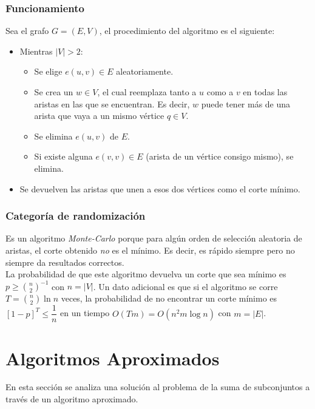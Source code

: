 \documentclass[a4paper, 10pt]{article}
\newcommand\tab[1][0.5cm]{\hspace*{#1}}
\begin{document}
            \subsubsection{Funcionamiento}
                Sea el grafo $G = (E, V)$, el procedimiento del algoritmo es el siguiente:
                \begin{itemize}
                    \item Mientras $|V| > 2$:
                    \begin{itemize}
                        \item Se elige $e(u, v) \in E$ aleatoriamente.
                        \item Se crea un $w \in V$, el cual reemplaza tanto a $u$ como a $v$ en todas
                        las aristas en las que se encuentran. Es decir, $w$ puede tener más de una arista
                        que vaya a un mismo vértice $q \in V$.
                        \item Se elimina $e(u, v)$ de $E$.
                        \item Si existe alguna $e(v, v) \in E$ (arista de un vértice consigo mismo), se elimina.
                    \end{itemize}
                    \item Se devuelven las aristas que unen a esos dos vértices como el corte mínimo.
                \end{itemize}
            \subsubsection{Categoría de randomización}
                    Es un algoritmo \emph{Monte-Carlo} porque para algún orden de selección aleatoria
                de aristas, el corte obtenido \emph{no} es el mínimo. Es decir, es rápido siempre pero no siempre
                da resultados correctos. \\
                \tab La probabilidad de que este algoritmo devuelva un corte que sea mínimo es $p \geqslant \binom{n}{2}^{-1}$
                con $n = |V|$. Un dato adicional es que si el algoritmo se corre $T = \binom{n}{2}\ln{n}$ veces,
                la probabilidad de no encontrar un corte mínimo es $[1-p]^T \leqslant \dfrac{1}{n}$ en un tiempo
                $O(Tm) = O(n^2m\log{n})$ con $m = |E|$.
    \newpage

    \section{Algoritmos Aproximados}
        \tab En esta sección se analiza una solución al problema de la suma de subconjuntos
        a través de un algoritmo aproximado.
\end{document}
